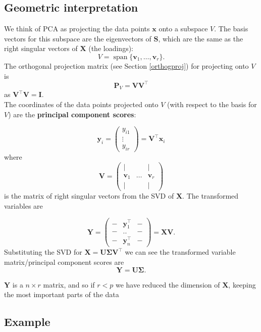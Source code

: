 \documentclass[
]{book}
\theoremstyle{definition}
\theoremstyle{definition}
\theoremstyle{definition}
\theoremstyle{definition}
\theoremstyle{remark}
\begin{document}
\subsection{Geometric interpretation}\label{geometric-interpretation-1}

We think of PCA as projecting the data points \(\mathbf x\) onto a subspace \(V\). The basis vectors for this subspace are the eigenvectors of \(\mathbf S\), which are the same as the right singular vectors of \(\mathbf X\) (the loadings):
\[V=\operatorname{span}\{\mathbf v_1, \ldots, \mathbf v_r\}.\]
The orthogonal projection matrix (see Section \ref{orthogproj}) for projecting onto \(V\) is
\[\mathbf P_V = \mathbf V\mathbf V^\top\]
as \(\mathbf V^\top \mathbf V=\mathbf I\).\\
The coordinates of the data points projected onto \(V\) (with respect to the basis for \(V\)) are the \textbf{principal component scores}:

\[\mathbf y_i= \left(\begin{array}{c}y_{i1}\\\vdots\\y_{ir}\end{array}\right)= \mathbf V^\top \mathbf x_i\]
where \[\mathbf V= \left(\begin{array}{ccc} | &&|\\\mathbf v_1&\ldots& \mathbf v_r\\  | &&|\end{array}\right)\]
is the matrix of right singular vectors from the SVD of \(\mathbf X\).
The transformed variables are

\[\mathbf Y= \left( \begin{array}{ccc}
- &\mathbf y_1^\top&-\\
- &..&-\\
- &\mathbf y_n^\top&-
\end{array}\right ) = \mathbf X\mathbf V.
\]
Substituting the SVD for \(\mathbf X= \mathbf U\boldsymbol{\Sigma}\mathbf V^\top\) we can see the transformed variable matrix/principal component scores are
\[\mathbf Y= \mathbf U\boldsymbol{\Sigma}.\]

\(\mathbf Y\) is a \(n \times r\) matrix, and so if \(r<p\) we have reduced the dimension of \(\mathbf X\), keeping the most important parts of the data

\subsection{Example}\label{example}
\end{document}
